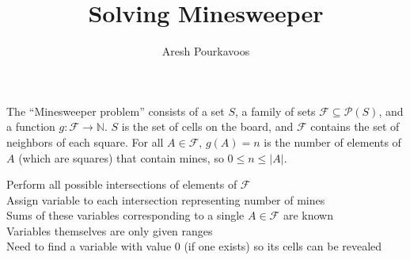 \documentclass{article}
\begin{document}
\title{Solving Minesweeper}
\author{Aresh Pourkavoos}
\maketitle

The ``Minesweeper problem'' consists of a set $S$,
a family of sets $\mathcal{F} \subseteq \mathcal{P}(S)$,
and a function $g : \mathcal{F} \rightarrow \mathbb{N}$.
$S$ is the set of cells on the board,
and $\mathcal{F}$ contains the set of neighbors of each square.
For all $A \in \mathcal{F}$, $g(A)=n$ is the number of elements of $A$
(which are squares) that contain mines,
so $0 \leq n \leq \vert A \vert$.

Perform all possible intersections of elements of $\mathcal{F}$ \\
Assign variable to each intersection representing number of mines \\
Sums of these variables corresponding to a single $A \in \mathcal{F}$ are known \\
Variables themselves are only given ranges \\
Need to find a variable with value 0 (if one exists)
so its cells can be revealed
\end{document}
